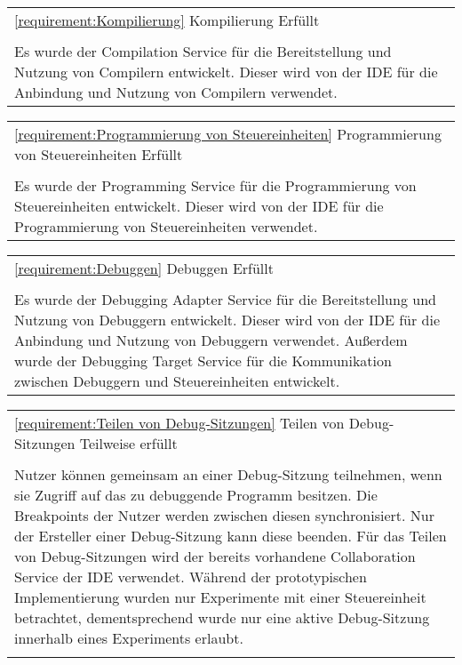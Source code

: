 \vfill
\begin{tabularx}{\textwidth}{X}
    \toprule
    \autoref{requirement:Kompilierung} \hfill Kompilierung \hfill Erfüllt
    \\
    \\
    Es wurde der Compilation Service für die Bereitstellung und Nutzung von Compilern entwickelt. Dieser wird von der IDE für die Anbindung und Nutzung von Compilern verwendet.
    \\
    \bottomrule
\end{tabularx}
\vfill
\begin{tabularx}{\textwidth}{X}
    \toprule
    \autoref{requirement:Programmierung von Steuereinheiten} \hfill Programmierung von Steuereinheiten  \hfill Erfüllt                                                    \\
    \\
    Es wurde der Programming Service für die Programmierung von Steuereinheiten entwickelt. Dieser wird von der IDE für die Programmierung von Steuereinheiten verwendet. \\
    \bottomrule
\end{tabularx}
\vfill
\begin{tabularx}{\textwidth}{X}
    \toprule
    \autoref{requirement:Debuggen} \hfill Debuggen \hfill Erfüllt
    \\
    \\
    Es wurde der Debugging Adapter Service für die Bereitstellung und Nutzung von Debuggern entwickelt. Dieser wird von der IDE für die Anbindung und Nutzung von Debuggern verwendet. Außerdem wurde der Debugging Target Service für die Kommunikation zwischen Debuggern und Steuereinheiten entwickelt.
    \\
    \bottomrule
\end{tabularx}
\vfill
\begin{tabularx}{\textwidth}{X}
    \toprule
    \autoref{requirement:Teilen von Debug-Sitzungen} \hfill Teilen von Debug-Sitzungen \hfill Teilweise erfüllt
    \\
    \\
    Nutzer können gemeinsam an einer Debug-Sitzung teilnehmen, wenn sie Zugriff auf das zu debuggende Programm besitzen. Die Breakpoints der Nutzer werden zwischen diesen synchronisiert. Nur der Ersteller einer Debug-Sitzung kann diese beenden. Für das Teilen von Debug-Sitzungen wird der bereits vorhandene Collaboration Service der IDE verwendet. Während der prototypischen Implementierung wurden nur Experimente mit einer Steuereinheit betrachtet, dementsprechend wurde nur eine aktive Debug-Sitzung innerhalb eines Experiments erlaubt.
    \\
    \bottomrule \\
\end{tabularx}
